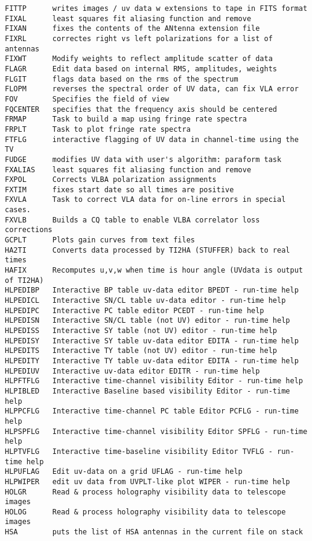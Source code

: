 \begin{verbatim}
FITTP      writes images / uv data w extensions to tape in FITS format
FIXAL      least squares fit aliasing function and remove
FIXAN      fixes the contents of the ANtenna extension file
FIXRL      correctes right vs left polarizations for a list of antennas
FIXWT      Modify weights to reflect amplitude scatter of data
FLAGR      Edit data based on internal RMS, amplitudes, weights
FLGIT      flags data based on the rms of the spectrum
FLOPM      reverses the spectral order of UV data, can fix VLA error
FOV        Specifies the field of view
FQCENTER   specifies that the frequency axis should be centered
FRMAP      Task to build a map using fringe rate spectra
FRPLT      Task to plot fringe rate spectra
FTFLG      interactive flagging of UV data in channel-time using the TV
FUDGE      modifies UV data with user's algorithm: paraform task
FXALIAS    least squares fit aliasing function and remove
FXPOL      Corrects VLBA polarization assignments
FXTIM      fixes start date so all times are positive
FXVLA      Task to correct VLA data for on-line errors in special cases.
FXVLB      Builds a CQ table to enable VLBA correlator loss corrections
GCPLT      Plots gain curves from text files
HA2TI      Converts data processed by TI2HA (STUFFER) back to real times
HAFIX      Recomputes u,v,w when time is hour angle (UVdata is output of TI2HA)
HLPEDIBP   Interactive BP table uv-data editor BPEDT - run-time help
HLPEDICL   Interactive SN/CL table uv-data editor - run-time help
HLPEDIPC   Interactive PC table editor PCEDT - run-time help
HLPEDISN   Interactive SN/CL table (not UV) editor - run-time help
HLPEDISS   Interactive SY table (not UV) editor - run-time help
HLPEDISY   Interactive SY table uv-data editor EDITA - run-time help
HLPEDITS   Interactive TY table (not UV) editor - run-time help
HLPEDITY   Interactive TY table uv-data editor EDITA - run-time help
HLPEDIUV   Interactive uv-data editor EDITR - run-time help
HLPFTFLG   Interactive time-channel visibility Editor - run-time help
HLPIBLED   Interactive Baseline based visibility Editor - run-time help
HLPPCFLG   Interactive time-channel PC table Editor PCFLG - run-time help
HLPSPFLG   Interactive time-channel visibility Editor SPFLG - run-time help
HLPTVFLG   Interactive time-baseline visibility Editor TVFLG - run-time help
HLPUFLAG   Edit uv-data on a grid UFLAG - run-time help
HLPWIPER   edit uv data from UVPLT-like plot WIPER - run-time help
HOLGR      Read & process holography visibility data to telescope images
HOLOG      Read & process holography visibility data to telescope images
HSA        puts the list of HSA antennas in the current file on stack

\end{verbatim}
